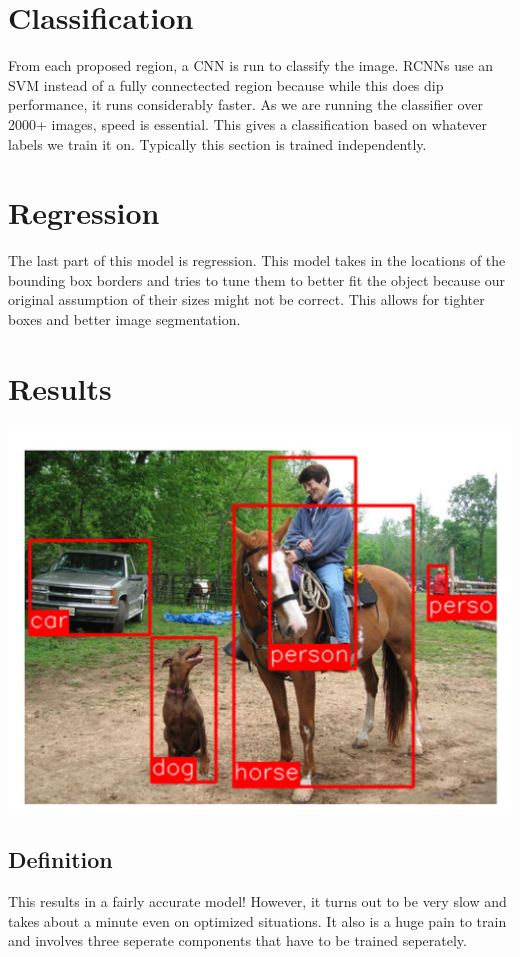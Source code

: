 \documentclass{article}
\begin{document}
\section{Classification}
From each proposed region, a CNN is run to classify the image. RCNNs use an SVM instead of a fully connectected region because while this does dip performance, it runs considerably faster. As we are running the classifier over 2000+ images, speed is essential. This gives a classification based on whatever labels we train it on. Typically this section is trained independently.

\section{Regression}
The last part of this model is regression. This model takes in the locations of the bounding box borders and tries to tune them to better fit the object because our original assumption of their sizes might not be correct. This allows for tighter boxes and better image segmentation.

\section{Results}
\begin{center}
\includegraphics[scale=0.5]{RCNNRun}
\end{center}
\subsection{Definition}
This results in a fairly accurate model! However, it turns out to be very slow and takes about a minute even on optimized situations. It also is a huge pain to train and involves three seperate components that have to be trained seperately.
\end{document}
